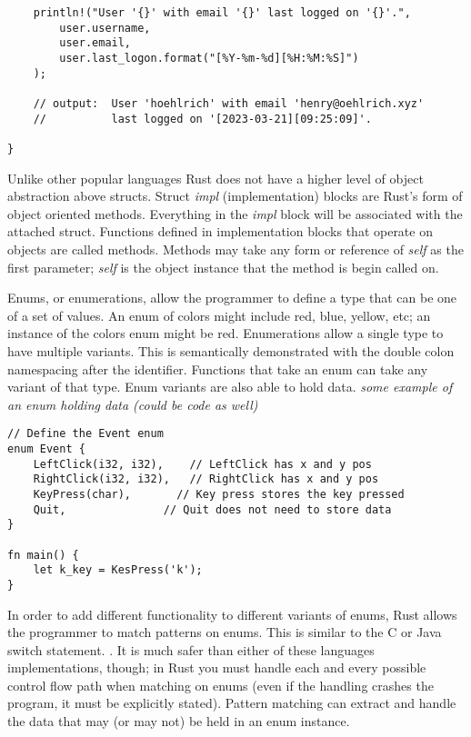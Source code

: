 \documentclass[12pt]{article}
\begin{document}
\begin{flushleft}
\begin{verbatim}
    println!("User '{}' with email '{}' last logged on '{}'.",
        user.username,
        user.email,
        user.last_logon.format("[%Y-%m-%d][%H:%M:%S]")
    );

    // output:  User 'hoehlrich' with email 'henry@oehlrich.xyz'
    //          last logged on '[2023-03-21][09:25:09]'.

}
\end{verbatim}
\doublespacing{}

Unlike other popular languages Rust does not have a higher level of object
abstraction above structs. Struct \textit{impl} (implementation) blocks are
Rust's form of object oriented methods. Everything in the \textit{impl} block
will be associated with the attached struct. Functions defined in
implementation blocks that operate on objects are called methods. Methods may
take any form or reference of \textit{self} as the first parameter;
\textit{self} is the object instance that the method is begin called on.

Enums, or enumerations, allow the programmer to define a type that can be one
of a set of values. An enum of colors might include red, blue, yellow, etc; an
instance of the colors enum might be red. Enumerations allow a single type to
have multiple variants. This is semantically demonstrated with the double colon
namespacing after the identifier. Functions that take an enum can take any
variant of that type. Enum variants are also able to hold data. \textit{some
example of an enum holding data (could be code as well)}

\singlespacing{}
\begin{verbatim}
// Define the Event enum
enum Event {
    LeftClick(i32, i32),    // LeftClick has x and y pos
    RightClick(i32, i32),   // RightClick has x and y pos
    KeyPress(char),       // Key press stores the key pressed
    Quit,               // Quit does not need to store data
}

fn main() {
    let k_key = KesPress('k');
}
\end{verbatim}
\doublespacing{}

In order to add different functionality to different variants of enums, Rust
allows the programmer to match patterns on enums. This is similar to the C or
Java switch statement. \textit{\cite{the-c-programming-language}}. It is much safer than
either of these languages implementations, though; in Rust you must handle each
and every possible control flow path when matching on enums (even if the
handling crashes the program, it must be explicitly stated). Pattern matching
can extract and handle the data that may (or may not) be held in an enum
instance.


\end{flushleft}
\end{document}
